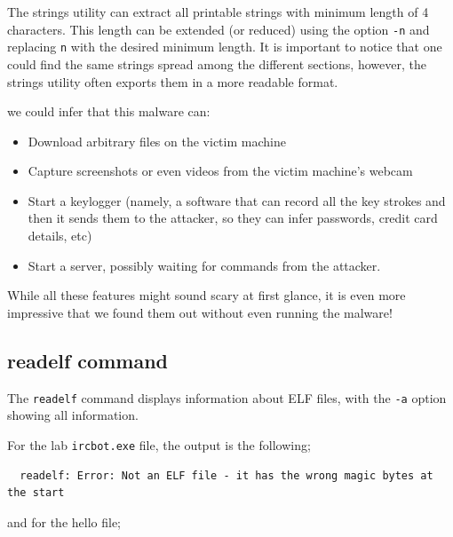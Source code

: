 \documentclass[]{project_plan}
\begin{document}
The strings utility can extract all printable strings with minimum
length of 4 characters. This length can be extended (or reduced) using the
option \lstinline|-n| and replacing \lstinline|n| with the desired minimum
length. It is important to
notice that one could find the same strings spread among the different sections,
however, the strings utility often exports them in a more readable format.

we could infer that this malware can:
\begin{itemize}
  \item Download arbitrary files on the victim machine
  \item Capture screenshots or even videos from the victim machine’s webcam
  \item Start a keylogger (namely, a software that can record all the key strokes
        and then it sends them to the attacker, so they can infer passwords, credit
        card details, etc)
  \item Start a server, possibly waiting for commands from the attacker.
\end{itemize}

While all these features might sound scary at first glance, it is even more
impressive that we found them out without even running the malware!

\subsection{readelf command}

The \lstinline|readelf| command displays information about ELF files, with
the \lstinline|-a| option showing all information.

For the lab
\lstinline|ircbot.exe| file, the output is the following;
\begin{lstlisting}
  readelf: Error: Not an ELF file - it has the wrong magic bytes at the start
\end{lstlisting}

and for the hello file;
\end{document}
